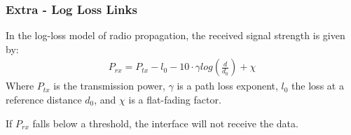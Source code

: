 \documentclass[mathserif,usenames,dvipsnames]{beamer}
\newcommand{\backupend}{
       \addtocounter{framenumberappendix}{-\value{framenumber}}
          \addtocounter{framenumber}{\value{framenumberappendix}} 
}
\begin{document}
\frame
{
    \frametitle{Extra - Log Loss Links}
    In the log-loss model of radio propagation, the received signal strength is given by:
    \begin{align*}
        P_{rx} = P_{tx} - l_0 - 10 \cdot \gamma log(\frac{d}{d_0}) + \chi
    \end{align*}
    Where $P_{tx}$ is the transmission power, $\gamma$ is a path loss exponent, $l_0$ the loss at a reference distance $d_0$, and $\chi$ is a flat-fading factor.

    If $P_{rx}$ falls below a threshold, the interface will not receive the data.
}

\backupend
\end{document}

